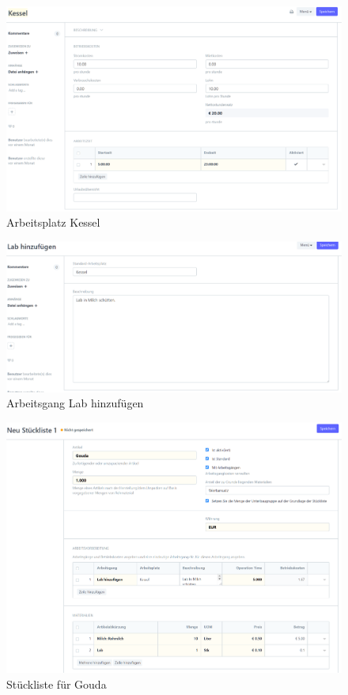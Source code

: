 \begin{figure}
  \centering
  \includegraphics[width=\textwidth]{Bilder/Arbeitsplatz.PNG}
  \caption{Arbeitsplatz \glqq Kessel\grqq}
  \label{fig:arbPlatz}
\end{figure}
\begin{figure}
  \centering
  \includegraphics[width=\textwidth]{Bilder/Arbeitsgang.PNG}
  \caption{Arbeitsgang \glqq Lab hinzufügen\grqq}
  \label{fig:arbGang}
\end{figure}
\begin{figure}
  \centering
  \includegraphics[width=\textwidth]{Bilder/Stueckliste.PNG}
  \caption{Stückliste für Gouda}
  \label{fig:stListe}
\end{figure}
